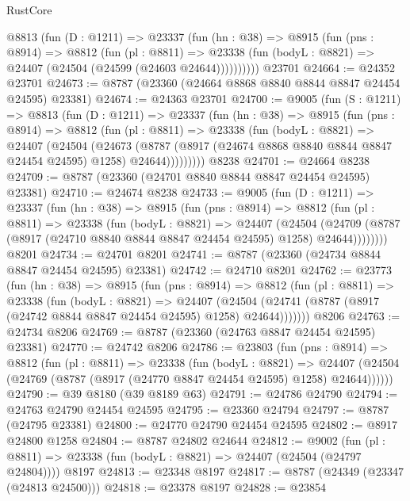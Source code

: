 \begin{lexlean}{RustCore}
\begin{coremodule}
      @8813
        (fun (D : @1211) =>
        @23337
          (fun (hn : @38) =>
          @8915
            (fun (pns : @8914) =>
            @8812
              (fun (pl : @8811) =>
              @23338 (fun (bodyL : @8821) => @24407 (@24504 (@24599 (@24603 @24644))))))))))
    @23701
@24664 := @24352 @23701
@24673 := @8787 (@23360 (@24664 @8868 @8840 @8844 @8847 @24454 @24595) @23381)
@24674 := @24363 @23701
@24700 := @9005
    (fun (S : @1211) =>
    @8813
      (fun (D : @1211) =>
      @23337
        (fun (hn : @38) =>
        @8915
          (fun (pns : @8914) =>
          @8812
            (fun (pl : @8811) =>
            @23338
              (fun (bodyL : @8821) =>
              @24407
                (@24504
                  (@24673
                    (@8787
                      (@8917 (@24674 @8868 @8840 @8844 @8847 @24454 @24595) @1258)
                      @24644)))))))))
    @8238
@24701 := @24664 @8238
@24709 := @8787 (@23360 (@24701 @8840 @8844 @8847 @24454 @24595) @23381)
@24710 := @24674 @8238
@24733 := @9005
    (fun (D : @1211) =>
    @23337
      (fun (hn : @38) =>
      @8915
        (fun (pns : @8914) =>
        @8812
          (fun (pl : @8811) =>
          @23338
            (fun (bodyL : @8821) =>
            @24407
              (@24504
                (@24709 (@8787 (@8917 (@24710 @8840 @8844 @8847 @24454 @24595) @1258) @24644))))))))
    @8201
@24734 := @24701 @8201
@24741 := @8787 (@23360 (@24734 @8844 @8847 @24454 @24595) @23381)
@24742 := @24710 @8201
@24762 := @23773
    (fun (hn : @38) =>
    @8915
      (fun (pns : @8914) =>
      @8812
        (fun (pl : @8811) =>
        @23338
          (fun (bodyL : @8821) =>
          @24407
            (@24504 (@24741 (@8787 (@8917 (@24742 @8844 @8847 @24454 @24595) @1258) @24644)))))))
    @8206
@24763 := @24734 @8206
@24769 := @8787 (@23360 (@24763 @8847 @24454 @24595) @23381)
@24770 := @24742 @8206
@24786 := @23803
    (fun (pns : @8914) =>
    @8812
      (fun (pl : @8811) =>
      @23338
        (fun (bodyL : @8821) =>
        @24407 (@24504 (@24769 (@8787 (@8917 (@24770 @8847 @24454 @24595) @1258) @24644))))))
@24790 := @39 @8180 (@39 @8189 @63)
@24791 := @24786 @24790
@24794 := @24763 @24790 @24454 @24595
@24795 := @23360 @24794
@24797 := @8787 (@24795 @23381)
@24800 := @24770 @24790 @24454 @24595
@24802 := @8917 @24800 @1258
@24804 := @8787 @24802 @24644
@24812 := @9002
    (fun (pl : @8811) => @23338 (fun (bodyL : @8821) => @24407 (@24504 (@24797 @24804))))
    @8197
@24813 := @23348 @8197
@24817 := @8787 (@24349 (@23347 (@24813 @24500)))
@24818 := @23378 @8197
@24828 := @23854

\end{coremodule}
\end{lexlean}
